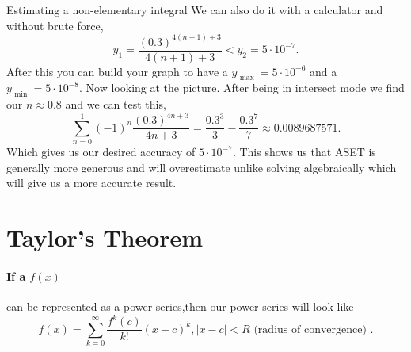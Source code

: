 \documentclass[a4paper]{article}
\begin{document}
\begin{exampleblock}{Estimating a non-elementary integral}
We can also do it with a calculator and without brute force,
\[
y_1 = \frac{ \left( 0.3 \right) ^{ 4\left( n+1 \right) +3 } }{ 4\left( n+1 \right) +3 }< y_2 = 5\cdot 10^{ -7 }
.\] 
After this you can build your graph to have a $ y_{ \text{ max } }= 5\cdot 10^{ -6 } $ and a $ y_{ \text{ min } }= 5\cdot 10^{ -8 } $. Now looking at the picture. After being in intersect mode we find our $ n\approx 0.8 $ and we can test this,
\[
\sum_{ n=0 } ^{ 1 } \left( -1 \right) ^{ n } \frac{ \left( 0.3 \right) ^{ 4n+3 } }{ 4n+3 } = \frac{ 0.3^{ 3 } }{ 3 }- \frac{ 0.3^{ 7 } }{ 7 } \approx 0.0089687571
.\] 
Which gives us our desired accuracy of $ 5\cdot 10^{ -7 } $. This shows us that ASET is generally more generous and will overestimate unlike solving algebraically which will give us a more accurate result.
\end{exampleblock}
\section{Taylor's Theorem}%
\label{sec:Taylor's Theorem}
\paragraph{If a $ f\left( x \right) $} can be represented as a power series,then our power series will look like 
\[
f\left( x \right) = \sum_{ k=0 } ^{ \infty } \frac{ f^{ k }\left( c \right)  }{ k! }\left( x-c \right) ^{ k }, \left| x-c \right|< R \text{ (radius of convergence) }
.\] 
\end{document}
